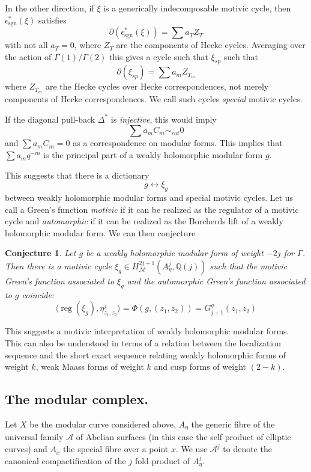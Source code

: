 \documentclass[11pt,a4paper]{article}
\newtheorem {conj}[defn]{Conjecture}
\newcommand {\A}{{\mathcal A}}
\newcommand {\Q}{{\mathds Q}}
\newcommand {\M}{{\mathcal M}}
\def\sgn{\operatorname{sgn}}
\def\reg{\operatorname{reg}}
\newcommand {\es}{{\epsilon^*_{\sgn}}}
\begin{document}
In the other direction, if $\xi$ is a generically indecomposable motivic cycle, then $\es(\xi)$ satisfies 
%
$$\partial(\es(\xi))=\sum a_T Z_{T}$$
%
with not all $a_T=0$, where $Z_{T}$ are the components of Hecke cycles. Averaging over  the action of $\Gamma(1)/\Gamma(2)$ this gives a cycle such that  $\xi_{sp}$ such that 
%
$$\partial(\xi_{sp})=\sum a_m Z_{T_m}$$ 
%
where $Z_{T_m}$ are the Hecke cycles over Hecke correspondences, not merely components of Hecke correspondences. We call such cycles {\em special} motivic cycles. 

If the diagonal pull-back $\Delta^*$ is {\em injective}, this would imply 
%
$$\sum a_m C_m \sim_{rat} 0 $$
%
and $\sum a_m C_m=0$ as a correspondence on modular forms. This implies that $\sum a_m q^{-m}$ is the principal part of a weakly holomorphic modular form $g$. 

This suggests that there is a dictionary 
%
$$ g \longleftrightarrow \xi_g $$
% 
between weakly holomorphic modular forms and special motivic cycles. Let us call a Green's function {\em motivic} if it can be realized as the regulator of a motivic cycle and {\em automorphic} if it can be realized as the Borcherds lift of a weakly holomorphic modular form. We can then conjecture 

\begin{conj}
	Let $g$ be a weakly holomorphic modular form of weight $-2j$ for $\Gamma$. Then there is a motivic cycle $\xi_g \in H^{2j+1}_{\M}(A^j_{\eta},\Q(j))$ such that the motivic Green's function associated to $\xi_g$ and the automorphic Green's function associated to $g$ coincide:
%
$$\langle\reg(\xi_g),\eta^j_{z_1,z_2}\rangle=\Phi(g,(z_1,z_2))=G^g_{j+1}(z_1,z_2)$$
%
\label{formscycleconjecture}
\end{conj}
%
This suggests a motivic interpretation of weakly holomorphic modular forms. This can also be understood in terms of a relation between the localization sequence and the short exact sequence relating weakly holomorphic forms of weight $k$, weak Maass forms of weight $k$  and cusp forms of weight $(2-k)$. 




\subsection{The modular  complex.}


\iffalse 

Let $X$ be the modular curve considered above, $A_{\eta}$ the generic fibre of the universal family $\A$ of Abelian surfaces (in this case the self  product of elliptic curves) and $A_x$ the special fibre over a point $x$. We use $\A^j$ to denote the canonical compactification of the $j$ fold product of $A_{\eta}^j$.
\end{document}
